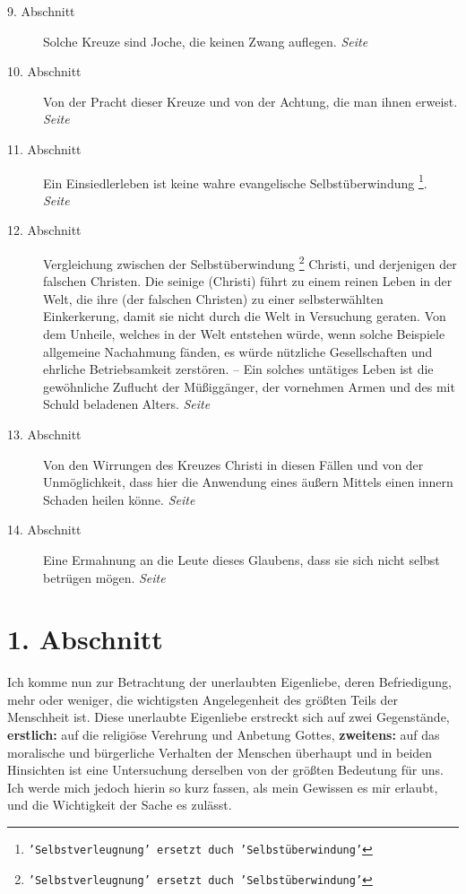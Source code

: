 \begin{description}
\item[9. Abschnitt] Solche Kreuze sind Joche, die keinen Zwang auflegen.
\dotfill \textit{Seite  \pageref{kap5_ab9}}\\
\item[10. Abschnitt] Von der Pracht dieser Kreuze und von der Achtung, die man
ihnen erweist.
\dotfill \textit{Seite  \pageref{kap5_ab10}}\\
\item[11. Abschnitt] Ein Einsiedlerleben ist keine wahre evangelische
Selbstüberwindung \footnote{\texttt{'Selbstverleugnung' ersetzt duch
'Selbstüberwindung'}}.
\dotfill \textit{Seite~\pageref{kap5_ab11}}\\
\item[12. Abschnitt] Vergleichung zwischen der Selbstüberwindung
\footnote{\texttt{'Selbstverleugnung' ersetzt duch 'Selbstüberwindung'}} Christi, und
derjenigen der falschen Christen. Die seinige (Christi) führt zu einem reinen
Leben in
der Welt, die ihre (der falschen Christen) zu einer selbsterwählten
Einkerkerung, damit sie nicht
durch die Welt in Versuchung geraten. Von dem Unheile, welches in der Welt
entstehen würde, wenn solche Beispiele allgemeine Nachahmung fänden, es würde
nützliche Gesellschaften und ehrliche Betriebsamkeit zerstören. -- Ein solches
untätiges Leben ist die gewöhnliche Zuflucht der Müßiggänger, der vornehmen
Armen und des mit Schuld beladenen Alters.
\dotfill \textit{Seite~\pageref{kap5_ab12}}\\
\item[13. Abschnitt] Von den Wirrungen des Kreuzes Christi in diesen Fällen und
von der Unmöglichkeit, dass hier die Anwendung eines äußern Mittels einen innern
Schaden heilen könne.
\dotfill \textit{Seite~\pageref{kap5_ab13}}\\
\item[14. Abschnitt] Eine Ermahnung an die Leute dieses Glaubens, dass sie sich
nicht selbst betrügen mögen.
\dotfill \textit{Seite~\pageref{kap5_ab14}}\\

\end{description}

\newpage

\section{1. Abschnitt} \label{kap5_ab1}

Ich komme nun zur Betrachtung der unerlaubten Eigenliebe, deren Befriedigung,
mehr oder weniger, die wichtigsten Angelegenheit des größten Teils der
Menschheit ist. Diese unerlaubte Eigenliebe erstreckt sich auf zwei Gegenstände,
\textbf{erstlich:} auf die religiöse Verehrung und Anbetung Gottes,
\textbf{zweitens:} auf das
moralische und bürgerliche Verhalten der Menschen überhaupt und in beiden
Hinsichten ist eine Untersuchung derselben von der größten Bedeutung für uns.
Ich werde mich jedoch hierin so kurz fassen, als mein Gewissen es mir erlaubt,
und die Wichtigkeit der Sache es zulässt.

